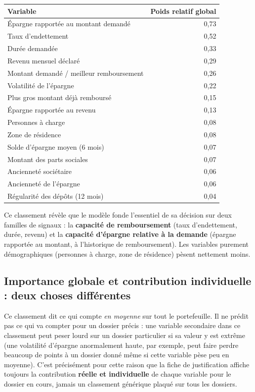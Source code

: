 \documentclass[11pt,a4paper]{article}
\begin{document}
\begin{center}
\begin{tabular}{lr}
\toprule
\textbf{Variable} & \textbf{Poids relatif global} \\
\midrule
Épargne rapportée au montant demandé & 0,73 \\
Taux d'endettement & 0,52 \\
Durée demandée & 0,33 \\
Revenu mensuel déclaré & 0,29 \\
Montant demandé / meilleur remboursement & 0,26 \\
Volatilité de l'épargne & 0,22 \\
Plus gros montant déjà remboursé & 0,15 \\
Épargne rapportée au revenu & 0,13 \\
Personnes à charge & 0,08 \\
Zone de résidence & 0,08 \\
Solde d'épargne moyen (6 mois) & 0,07 \\
Montant des parts sociales & 0,07 \\
Ancienneté sociétaire & 0,06 \\
Ancienneté de l'épargne & 0,06 \\
Régularité des dépôts (12 mois) & 0,04 \\
\bottomrule
\end{tabular}
\end{center}

Ce classement révèle que le modèle fonde l'essentiel de sa décision sur deux familles de signaux
: la \textbf{capacité de remboursement} (taux d'endettement, durée, revenu) et la \textbf{capacité
d'épargne relative à la demande} (épargne rapportée au montant, à l'historique de remboursement).
Les variables purement démographiques (personnes à charge, zone de résidence) pèsent nettement
moins.

\subsection{Importance globale et contribution individuelle : deux choses différentes}

Ce classement dit ce qui compte \emph{en moyenne} sur tout le portefeuille. Il ne prédit pas ce
qui va compter pour un dossier précis : une variable secondaire dans ce classement peut peser
lourd sur un dossier particulier si sa valeur y est extrême (une volatilité d'épargne
anormalement haute, par exemple, peut faire perdre beaucoup de points à un dossier donné même si
cette variable pèse peu en moyenne). C'est précisément pour cette raison que la fiche de
justification affiche toujours la contribution \textbf{réelle et individuelle} de chaque variable
pour le dossier en cours, jamais un classement générique plaqué sur tous les dossiers.
\end{document}
